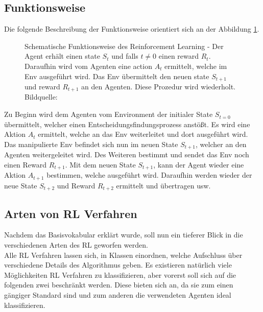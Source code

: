 \subsection{Funktionsweise} \label{subsec:Grundlagen_Funktionsweise}
Die folgende Beschreibung der Funktionsweise orientiert sich an der Abbildung \ref{fig:Grundlagen_Reinforcement_Learning}.
\begin{figure}[H]
	\centering
	
	\caption[Reinforcement Learning]{Schematische Funktionsweise des Reinforcement Learning - Der Agent erhält einen state $S_{t}$ und falls 
		$t \neq 0$ einen reward $R_{t}$. Daraufhin wird vom Agenten eine action $A_{t}$ ermittelt, welche im Env ausgeführt wird. Das Env übermittelt den neuen state $S_{t+1}$ und reward $R_{t+1}$ an den Agenten. Diese Prozedur wird wiederholt. Bildquelle: \citep[S. 38]{Sutton1998}}
	\label{fig:Grundlagen_Reinforcement_Learning}
\end{figure}
Zu Beginn wird dem Agenten vom Environment der initialer State $S_{t=0}$ übermittelt, welcher einen Entscheidungsfindungsprozess anstößt. Es wird eine Aktion $A_{t}$ ermittelt, welche an das Env weiterleitet und dort ausgeführt wird.
Das manipulierte Env befindet sich nun im neuen State $S_{t+1}$, welcher an den Agenten weitergeleitet wird. Des Weiteren bestimmt und sendet das Env noch einen Reward $R_{t+1}$.
Mit dem neuen State $S_{t+1}$, kann der Agent wieder eine Aktion $A_{t+1}$ bestimmen, welche ausgeführt wird. Daraufhin werden wieder der neue State $S_{t+2}$ und Reward $R_{t+2}$ ermittelt und übertragen usw. \citep[S. 37 ff.]{Sutton1998}

\subsection{Arten von RL Verfahren} \label{subsec:Grundlagen_Arten_RL_Verfahren}
Nachdem das Basisvokabular erklärt wurde, soll nun ein tieferer Blick in die verschiedenen Arten des RL geworfen werden.\\
Alle RL Verfahren lassen sich, in Klassen einordnen, welche Aufschluss über verschiedene Details des Algorithmus geben. Es existieren natürlich viele Möglichkeiten RL Verfahren zu klassifizieren, aber vorerst soll sich auf die folgenden zwei beschränkt werden. Diese bieten sich an, da sie zum einen gängiger Standard sind und zum anderen die verwendeten Agenten ideal klassifizieren.

